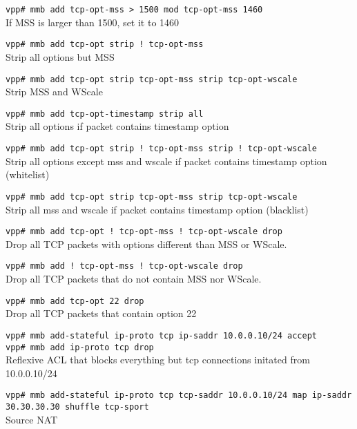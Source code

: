 \documentclass[a4paper,twoside,11pt]{report}
\begin{document}
\texttt{vpp\# mmb add tcp-opt-mss > 1500 mod tcp-opt-mss 1460} \\
   If MSS is larger than 1500, set it to 1460

\texttt{vpp\# mmb add tcp-opt strip !\ tcp-opt-mss} \\
   Strip all options but MSS

\texttt{vpp\# mmb add tcp-opt strip tcp-opt-mss strip tcp-opt-wscale} \\
   Strip MSS and WScale

\texttt{vpp\# mmb add tcp-opt-timestamp strip all} \\
   Strip all options if packet contains timestamp option

\texttt{vpp\# mmb add tcp-opt strip !\ tcp-opt-mss strip !\ tcp-opt-wscale} \\
   Strip all options except mss and wscale if packet contains timestamp option (whitelist)

\texttt{vpp\# mmb add tcp-opt strip tcp-opt-mss strip tcp-opt-wscale} \\
   Strip all mss and wscale if packet contains timestamp option (blacklist)

\texttt{vpp\# mmb add tcp-opt !\ tcp-opt-mss !\ tcp-opt-wscale  drop} \\
   Drop all TCP packets with options different than MSS or WScale.

\texttt{vpp\# mmb add !\ tcp-opt-mss !\ tcp-opt-wscale drop} \\
   Drop all TCP packets that do not contain MSS nor WScale.

\texttt{vpp\# mmb add tcp-opt 22 drop} \\
   Drop all TCP packets that contain option 22

\texttt{vpp\# mmb add-stateful ip-proto tcp ip-saddr 10.0.0.10/24 accept} \\
\texttt{vpp\# mmb add ip-proto tcp drop} \\
   Reflexive ACL that blocks everything but tcp connections initated from 10.0.0.10/24

\texttt{vpp\# mmb add-stateful ip-proto tcp tcp-saddr 10.0.0.10/24 map ip-saddr 30.30.30.30 shuffle tcp-sport} \\
   Source NAT



\small

%
\end{document}
